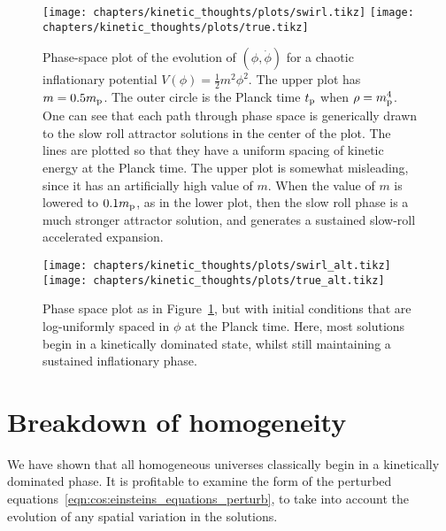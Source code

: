\begin{figure}[tp]
  \centering
  \texttt{[image: chapters/kinetic\_thoughts/plots/swirl.tikz]}
  \texttt{[image: chapters/kinetic\_thoughts/plots/true.tikz]}
  \caption{Phase-space plot of the evolution of \((\phi,\dot{\phi})\) for a chaotic inflationary potential \(V(\phi) = \frac{1}{2}m^2 \phi^2\). The upper plot has \(m=0.5m_{\mathrm{p}}\). The outer circle is the Planck time \(t_{\mathrm{p}}\) when \(\rho=m_{\mathrm{p}}^4\). One can see that each path through phase space is generically drawn to the slow roll attractor solutions in the center of the plot. The lines are plotted so that they have a uniform spacing of kinetic energy at the Planck time.
  The upper plot is somewhat misleading, since it has an artificially high value of \(m\). When the value of \(m\) is lowered to \(0.1m_{\mathrm{p}}\), as in the lower plot, then the slow roll phase is a much stronger attractor solution, and generates a sustained slow-roll accelerated expansion.\label{fig:kt:linde}}
\end{figure}

\begin{figure}[tp]
  \centering
  \texttt{[image: chapters/kinetic\_thoughts/plots/swirl\_alt.tikz]}
  \texttt{[image: chapters/kinetic\_thoughts/plots/true\_alt.tikz]}
  \caption{Phase space plot as in Figure~\protect\ref{fig:kt:linde}, but with initial conditions that are log-uniformly spaced in \(\phi\) at the Planck time. Here, most solutions begin in a kinetically dominated state, whilst still maintaining a sustained inflationary phase.}
\end{figure}




\section{Breakdown of homogeneity}
We have shown that all homogeneous universes classically begin in a kinetically dominated phase. It is profitable to examine the form of the perturbed equations~\eqref{eqn:cos:einsteins_equations_perturb}, to take into account the evolution of any spatial variation in the solutions.

